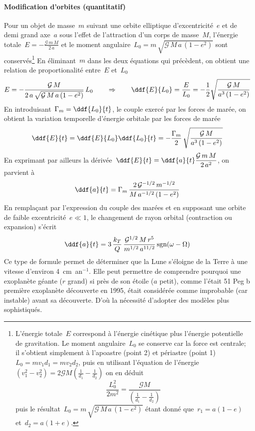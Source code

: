 \paragraph{Modification d'orbites (quantitatif)} Pour un objet de masse~$m$ suivant une orbite elliptique d'excentricité~$e$ et de demi grand axe~$a$ sous l'effet de l'attraction d'un corps de masse~$M$, l'énergie totale~$E = - \frac{\mathcal{G}\,m\,M}{2\,a}$ et le moment angulaire~$L_0 = m \, \sqrt{\mathcal{G}\,M\,a\,(1-e^2)}$ sont conservés\footnote{L'énergie totale~$E$ correspond à l'énergie cinétique
plus l'énergie potentielle de gravitation. %
Le moment angulaire~$L_0$ se conserve car la force est centrale; 
il s'obtient simplement à l'apoastre (point 2) et périastre (point 1)
$L_0 = m v_1 d_1 = m v_2 d_2$, puis en utilisant
l'équation de l'énergie~$\left( v_1^2 - v_2^2 \right) = 2 \mathcal{G} M \left( \frac{1}{d_1} - \frac{1}{d_2} \right)$
on en déduit
\[ \frac{L_0^2}{2 m^2} = \frac{\mathcal{G}M}{(\frac{1}{d_1}-\frac{1}{d_2})} \]
puis le résultat~$L_0 = m \, \sqrt{\mathcal{G}\,M\,a\,(1-e^2)}$
étant donné que~$r_1 = a (1-e)$ et~$d_2 = a (1+e)$.}
En éliminant~$m$ dans les deux équations qui précèdent, on obtient une relation de proportionalité entre~$E$ et~$L_0$
\[ E = - \frac{\mathcal{G}\,M}{2\,a\,\sqrt{\mathcal{G} \, M \, a \, (1-e^2)}} \,L_0 \qquad \Rightarrow \qquad \ddf{E}{L_0} = \frac{E}{L_0} = - \frac{1}{2} \sqrt{ \frac{\mathcal{G}\,M}{a^3 \, (1-e^2)} } \]
En introduisant~$\Gamma_m = \ddf{L_0}{t}$, le couple exercé par les forces de marée, on obtient la variation temporelle d'énergie orbitale par les forces de marée
\[ \ddf{E}{t} = \ddf{E}{L_0} \ddf{L_0}{t} = - \frac{\Gamma_m}{2} \, \sqrt{ \frac{\mathcal{G}\,M}{a^3 \, (1-e^2) } } \]
\noindent En exprimant par ailleurs la dérivée~$\ddf{E}{t} = \ddf{a}{t} \dfrac{\mathcal{G}\,m\,M}{2\,a^2}$, on parvient à
\[ \ddf{a}{t} = \Gamma_m \, \frac{2\,\mathcal{G}^{-1/2}\,m^{-1/2}}{M \, a^{-1/2} \, (1-e^2) } \]
\noindent En remplaçant par l'expression du couple des marées 
et en supposant une orbite de faible excentricité~$e \ll 1$, le changement de rayon orbital (contraction ou expansion) s'écrit
\[
\ddf{a}{t} = 3 \, \frac{k_T}{Q} \, \frac{\mathcal{G}^{1/2}\,M\,r^5}{m^{1/2} \, a^{11/2} } \, \textrm{sgn}(\omega-\Omega)
\]
Ce type de formule permet de déterminer que la Lune s'éloigne de la Terre à une vitesse d'environ 4~cm~an$^{-1}$.
Elle peut permettre de comprendre pourquoi une exoplanète géante ($r$ grand) si près de son étoile ($a$ petit),
comme l'était 51 Peg b première exoplanète découverte en 1995, était considérée comme 
improbable (car instable) avant sa découverte. D'où la nécessité d'adopter des modèles plus sophistiqués.

